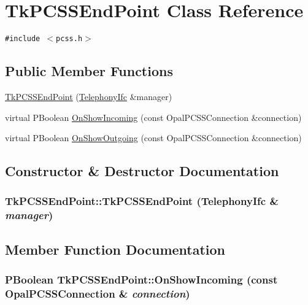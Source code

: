 \hypertarget{classTkPCSSEndPoint}{
\section{TkPCSSEndPoint Class Reference}
\label{classTkPCSSEndPoint}
}
{\tt \#include $<$pcss.h$>$}

\subsection*{Public Member Functions}
\begin{CompactItemize}
\item 
\hyperlink{classTkPCSSEndPoint_dcb03eb64065d741b07370bc9b36e1c7}{TkPCSSEndPoint} (\hyperlink{classTelephonyIfc}{TelephonyIfc} \&manager)
\item 
virtual PBoolean \hyperlink{classTkPCSSEndPoint_70abe85f45efc4919b5291b2566b04bf}{OnShowIncoming} (const OpalPCSSConnection \&connection)
\item 
virtual PBoolean \hyperlink{classTkPCSSEndPoint_3ba10c4cad067f03cbaeeb0586963b60}{OnShowOutgoing} (const OpalPCSSConnection \&connection)
\end{CompactItemize}


\subsection{Constructor \& Destructor Documentation}
\hypertarget{classTkPCSSEndPoint_dcb03eb64065d741b07370bc9b36e1c7}{
\subsubsection[{TkPCSSEndPoint}]{\setlength{\rightskip}{0pt plus 5cm}TkPCSSEndPoint::TkPCSSEndPoint ({\bf TelephonyIfc} \& {\em manager})}}
\label{classTkPCSSEndPoint_dcb03eb64065d741b07370bc9b36e1c7}




\subsection{Member Function Documentation}
\hypertarget{classTkPCSSEndPoint_70abe85f45efc4919b5291b2566b04bf}{
\subsubsection[{OnShowIncoming}]{\setlength{\rightskip}{0pt plus 5cm}PBoolean TkPCSSEndPoint::OnShowIncoming (const OpalPCSSConnection \& {\em connection})}}
\label{classTkPCSSEndPoint_70abe85f45efc4919b5291b2566b04bf}


